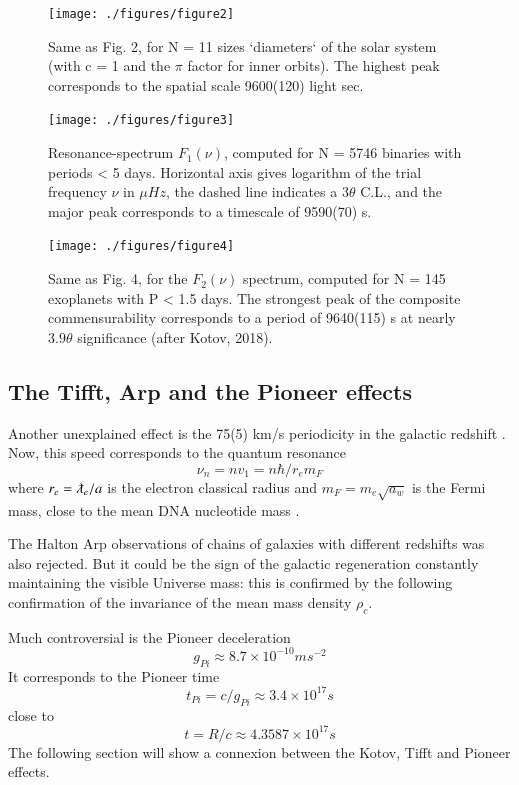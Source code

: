 \documentclass[twoside,draft]{article}
\begin{document}
\begin{sloppypar}
\begin{figure}
\centering
\texttt{[image: ./figures/figure2]}
\caption{Same as Fig. 2, for N = 11 sizes `diameters` of the solar system (with c = 1 and the $\pi$
factor for inner orbits). The highest peak corresponds to the spatial scale 9600(120) light sec.}
\label{fig:figure_label}
\end{figure}

\begin{figure}
\centering
\texttt{[image: ./figures/figure3]}
\caption{Resonance-spectrum $F_{1} ( \nu)$, computed for N = 5746 binaries with periods < 5 days.
Horizontal axis gives logarithm of the trial frequency $\nu$ in $\mu Hz$, the dashed line indicates a $3 \theta$
C.L., and the major peak corresponds to a timescale of 9590(70) s.}
\label{fig:figure_label}
\end{figure}

\begin{figure}
\centering
\texttt{[image: ./figures/figure4]}
\caption{Same as Fig. 4, for the $F_{2} ( \nu )$ spectrum, computed for N = 145 exoplanets with P < 1.5
days. The strongest peak of the composite commensurability corresponds to a period of 9640(115) s
at nearly $3.9\theta$ significance (after Kotov, 2018).}
\label{fig:figure_label}
\end{figure}

\subsection{The Tifft, Arp and the Pioneer effects}

Another unexplained effect is the 75(5) km/s periodicity in the galactic redshift \cite{Tifft}. Now, this
speed corresponds to the quantum resonance $$\nu_{n} = nv_{1} =n\hbar /r_{e} m_{F} $$ where $r_{e} = \lambdabar_e/a$ is the electron classical radius and $m_{F} = m_{e}\sqrt{a_{w}}$ is the Fermi mass, close to the mean DNA nucleotide mass \cite{Sanchez1}.

The Halton Arp observations of chains of galaxies with different redshifts \cite{Arp} was also
rejected. But it could be the sign of the galactic regeneration constantly maintaining the visible
Universe mass: this is confirmed by the following confirmation of the invariance of the mean mass
density $\rho_{c}$.

Much controversial is the Pioneer deceleration \cite{Nieto} $$g_{Pi} \approx 8.7 \times 10^{-10} ms^{-2}$$ It corresponds to
the Pioneer time $$t_{Pi} = c/g_{Pi} \approx 3.4 \times 10^{17} s $$ close to $$t = R/c \approx 4.3587 \times 10^{17} s $$ The following section will show a connexion between the Kotov, Tifft and Pioneer effects.


\end{sloppypar}
\end{document}

